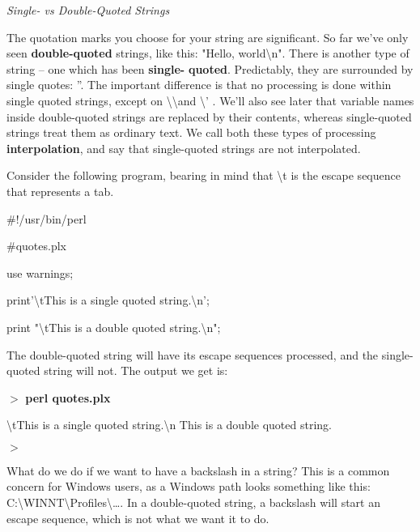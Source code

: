 \documentclass[a4paper,11pt]{book}
\begin{document}
\noindent 

\noindent \textit{Single- vs Double-Quoted Strings}

\noindent The quotation marks you choose for your string are significant. So far we've only seen \textbf{double-quoted} strings, like this: "Hello, world\textbackslash n". There is another type of string -- one which has been \textbf{single-} \textbf{quoted}. Predictably, they are surrounded by single quotes: ''. The important difference is that no processing is done within single quoted strings, except on \textbackslash \textbackslash  and \textbackslash ' . We'll also see later that variable names inside double-quoted strings are replaced by their contents, whereas single-quoted strings treat them as ordinary text. We call both these types of processing \textbf{interpolation}, and say that single-quoted strings are not interpolated.

\noindent 

\noindent 

\noindent Consider the following program, bearing in mind that \textbackslash t is the escape sequence that represents a tab.

\noindent 

\noindent \#!/usr/bin/perl

\noindent \#quotes.plx

\noindent use warnings;

\noindent print'\textbackslash tThis is a single quoted string.\textbackslash n';

\noindent print "\textbackslash tThis is a double quoted string.\textbackslash n";

\noindent 

\noindent The double-quoted string will have its escape sequences processed, and the single-quoted string will not. The output we get is:

\noindent 

\noindent $>$ \textbf{perl quotes.plx}

\noindent \textbackslash tThis is a single quoted string.\textbackslash n This is a double quoted string.

\noindent $>$

\noindent 

\noindent What do we do if we want to have a backslash in a string? This is a common concern for Windows users, as a Windows path looks something like this: C:\textbackslash WINNT\textbackslash Profiles\textbackslash \dots . In a double-quoted string, a backslash will start an escape sequence, which is not what we want it to do.
\end{document}
